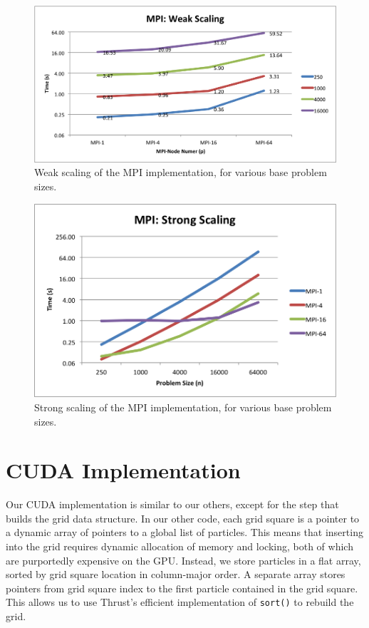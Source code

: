 \documentclass{article}
\newcommand{\code}[1]%
  {\texttt{#1}}
\begin{document}
\begin{figure}
  \includegraphics[width=\textwidth]{plots/MPI-weak-scaling.png}
  \caption{Weak scaling of the MPI implementation, for various base problem sizes.}
  \label{fig:mpi-weak}
\end{figure}

\begin{figure}
  \includegraphics[width=\textwidth]{plots/MPI-strong-scaling.png}
  \caption{Strong scaling of the MPI implementation, for various base problem sizes.}
  \label{fig:mpi-strong}
\end{figure}

\section{CUDA Implementation}
Our CUDA implementation is similar to our others, except for the step that builds the grid data structure.  In our other code, each grid square is a pointer to a dynamic array of pointers to a global list of particles.  This means that inserting into the grid requires dynamic allocation of memory and locking, both of which are purportedly expensive on the GPU.  Instead, we store particles in a flat array, sorted by grid square location in column-major order.  A separate array stores pointers from grid square index to the first particle contained in the grid square.  This allows us to use Thrust's efficient implementation of \code{sort()} to rebuild the grid.
\end{document}
